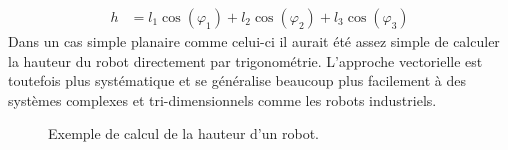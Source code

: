 \begin{example}
\begin{align}
h &= l_1 \cos (\varphi_1) + l_2 \cos (\varphi_2) + l_3 \cos (\varphi_3)
\label{eq:vecaddprojphi}
\end{align} 
Dans un cas simple planaire comme celui-ci il aurait été assez simple de calculer la hauteur du robot directement par trigonométrie. L'approche vectorielle est toutefois plus systématique et se généralise beaucoup plus facilement à des systèmes complexes et tri-dimensionnels comme les robots industriels.
%
\begin{figure}[H]
        \centering
				\hspace{3pt}
				\hspace{3pt}
				\hspace{3pt}
        \caption{Exemple de calcul de la hauteur d'un robot.}
				\label{fig:vecposunipro}
\end{figure}
\end{example}



